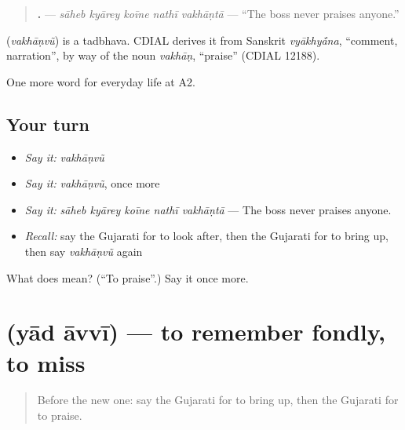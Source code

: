 \begin{quote}
\textbf{    .} — \emph{sāheb kyārey koīne nathī vakhāṇtā} — \textquotedblleft{}The boss never praises anyone.\textquotedblright{}
\end{quote}

\begin{cousinweb}
\textbf{} (\emph{vakhāṇvũ}) is a tadbhava. CDIAL derives it from Sanskrit \emph{vyākhy\'{\={a}}na}, \textquotedblleft{}comment, narration\textquotedblright{}, by way of the noun \emph{vakhāṇ}, \textquotedblleft{}praise\textquotedblright{} (CDIAL 12188).
\end{cousinweb}

\begin{grammarlens}[title={What you've built}]
One more word for everyday life at A2.
\end{grammarlens}

\subsection*{Your turn}
\begin{itemize}
\raggedright
  \item \emph{Say it:} \emph{vakhāṇvũ}
  \item \emph{Say it:} \emph{vakhāṇvũ}, once more
  \item \emph{Say it:} \emph{sāheb kyārey koīne nathī vakhāṇtā} — The boss never praises anyone.
  \item \emph{Recall:} say the Gujarati for to look after, then the Gujarati for to bring up, then say \emph{vakhāṇvũ} again
\end{itemize}

\begin{tcolorbox}[breakable,colback=teal!4,colframe=teal!35!black,title={Before you move on}]
What does  mean? (\textquotedblleft{}To praise\textquotedblright{}.) Say it once more.
\end{tcolorbox}
\section[\texorpdfstring{\gu{યાદ} \gu{આવવી} (yād āvvī)}{યાદ આવવી (yād āvvī)}]{  (yād āvvī) — to remember fondly, to miss}

\label{lesson:GU-C269-yad-avvi}



\begin{quote}
Before the new one: say the Gujarati for to bring up, then the Gujarati for to praise.
\end{quote}

